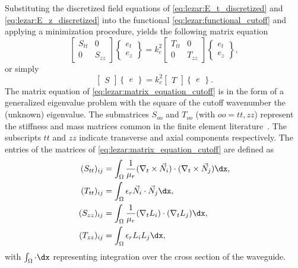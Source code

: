 Substituting the discretized field equations of
\eqref{eq:lezar:E_t_discretized} and \eqref{eq:lezar:E_z_discretized}
into the functional \eqref{eq:lezar:functional_cutoff} and
applying a minimization procedure, yields the following matrix
equation~\citep{Davidson2011}
\begin{equation}
    \label{eq:lezar:matrix_equation_cutoff}
    \begin{bmatrix}
      S_{tt} & 0\\0 & S_{zz}
    \end{bmatrix}
    \begin{Bmatrix}
    e_t
    \\
    e_z
    \end{Bmatrix}
  = k_c^2
    \begin{bmatrix}T_{tt} & 0
    \\
    0 &   T_{zz}\end{bmatrix}
    \begin{Bmatrix}
        e_t
      \\
      e_z
    \end{Bmatrix},
\end{equation}
or simply
\begin{equation}
  \begin{bmatrix}
      S
  \end{bmatrix}
  \begin{Bmatrix}
      e
    \end{Bmatrix}
  =
    k_c^2
    \begin{bmatrix}
      T
    \end{bmatrix}
    \begin{Bmatrix}
      e
    \end{Bmatrix}.
\end{equation}
The matrix equation of \eqref{eq:lezar:matrix_equation_cutoff}
is in the form of a generalized eigenvalue problem with the
square of the cutoff wavenumber the (unknown) eigenvalue. The
submatrices $S_{oo}$ and $T_{oo}$ (with $oo = tt, zz$)
represent the stiffness and mass matrices common in the finite element
literature~\citep{Davidson2011, Jin2002}. The subscripts $tt$ and $zz$
indicate transverse and axial components respectively. The entries of
the matrices of \eqref{eq:lezar:matrix_equation_cutoff} are defined
as \citep{PelosiCoccioliSelleri1998, Jin2002}
\begin{align}
\label{eq:lezar:S_tt_ij}
(S_{tt})_{ij} &= \int_\Omega \frac{1}{\mu_r}(\nabla_t\times\vec{N}_i)\cdot(\nabla_t\times\vec{N}_j) \dx,\\
\label{eq:lezar:T_tt_ij}
(T_{tt})_{ij} &= \int_\Omega \epsilon_r\vec{N}_i\cdot\vec{N}_j \dx,\\
\label{eq:lezar:S_zz_ij}
(S_{zz})_{ij} &= \int_\Omega \frac{1}{\mu_r}(\nabla_t L_i)\cdot(\nabla_t L_j) \dx,\\
\label{eq:lezar:T_zz_ij}
(T_{zz})_{ij} &= \int_\Omega \epsilon_r L_i L_j \dx,
\end{align}
with $\int_\Omega\cdot \dx$ representing integration over the cross
section of the waveguide.

